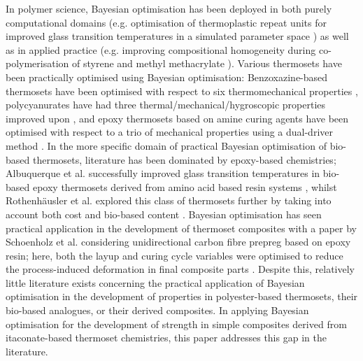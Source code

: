 In polymer science, Bayesian optimisation has been deployed in
 both purely computational domains (e.g. optimisation of thermoplastic
 repeat units for improved glass transition temperatures in a simulated
 parameter space \autocite{Minami2019}) as well as in applied practice
 (e.g. improving compositional homogeneity during co-polymerisation
 of styrene and methyl methacrylate \autocite{Takasuka2024}).
Various thermosets have been practically optimised using 
 Bayesian optimisation: Benzoxazine-based thermosets have been optimised
 with respect to six thermomechanical properties \autocite{Lu2025},
 polycyanurates have had three thermal/mechanical/hygroscopic properties
 improved upon \autocite{Xu2023}, and epoxy thermosets based on amine curing
 agents have been optimised with respect to a trio of mechanical
 properties using a dual-driver method \autocite{Zhao2024}.
In the more specific domain of practical Bayesian optimisation of
 bio-based thermosets, literature has been dominated by epoxy-based
 chemistries; Albuquerque et al. successfully improved glass transition
 temperatures in bio-based epoxy thermosets derived from amino acid based
 resin systems \autocite{Albuquerque2024}, whilst Rothenh\"{a}usler et al.
 explored this class of thermosets further by taking into account both cost
 and bio-based content \autocite{Rothenhausler2024}.
Bayesian optimisation has seen practical application in the development
 of thermoset composites with a paper by Schoenholz et al. considering
 unidirectional carbon fibre prepreg based on epoxy resin; here, both the
 layup and curing cycle variables were optimised to reduce the 
 process-induced deformation in final composite parts \autocite{Schoenholz2024}.
Despite this, relatively little literature exists concerning the practical
 application of Bayesian optimisation in the development of properties in
 polyester-based thermosets, their bio-based analogues, or their derived
 composites.
In applying Bayesian optimisation for the development of strength in
 simple composites derived from itaconate-based thermoset chemistries, 
 this paper addresses this gap in the literature.